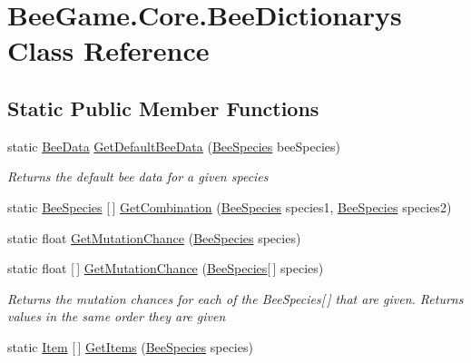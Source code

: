 \hypertarget{class_bee_game_1_1_core_1_1_bee_dictionarys}{}\section{Bee\+Game.\+Core.\+Bee\+Dictionarys Class Reference}
\label{class_bee_game_1_1_core_1_1_bee_dictionarys}


 


\subsection*{Static Public Member Functions}
\begin{DoxyCompactItemize}
\item 
static \hyperlink{struct_bee_game_1_1_bee_1_1_bee_data}{Bee\+Data} \hyperlink{class_bee_game_1_1_core_1_1_bee_dictionarys_acc616a791a2b14382dbff21433551596}{Get\+Default\+Bee\+Data} (\hyperlink{namespace_bee_game_1_1_enums_aa2ead984825678d83c42d48f6382619c}{Bee\+Species} bee\+Species)
\begin{DoxyCompactList}\small\item\em Returns the default bee data for a given species \end{DoxyCompactList}\item 
static \hyperlink{namespace_bee_game_1_1_enums_aa2ead984825678d83c42d48f6382619c}{Bee\+Species} \mbox{[}$\,$\mbox{]} \hyperlink{class_bee_game_1_1_core_1_1_bee_dictionarys_ac2d555d589392daf8d2919b6bf1fbad1}{Get\+Combination} (\hyperlink{namespace_bee_game_1_1_enums_aa2ead984825678d83c42d48f6382619c}{Bee\+Species} species1, \hyperlink{namespace_bee_game_1_1_enums_aa2ead984825678d83c42d48f6382619c}{Bee\+Species} species2)
\item 
static float \hyperlink{class_bee_game_1_1_core_1_1_bee_dictionarys_adb5fe5760a94dbff606bc1d20ee67aaa}{Get\+Mutation\+Chance} (\hyperlink{namespace_bee_game_1_1_enums_aa2ead984825678d83c42d48f6382619c}{Bee\+Species} species)
\item 
static float \mbox{[}$\,$\mbox{]} \hyperlink{class_bee_game_1_1_core_1_1_bee_dictionarys_ae563db005a03a49d25cb6cdbd4d3a82e}{Get\+Mutation\+Chance} (\hyperlink{namespace_bee_game_1_1_enums_aa2ead984825678d83c42d48f6382619c}{Bee\+Species}\mbox{[}$\,$\mbox{]} species)
\begin{DoxyCompactList}\small\item\em Returns the mutation chances for each of the Bee\+Species\mbox{[}$\,$\mbox{]} that are given. Returns values in the same order they are given \end{DoxyCompactList}\item 
static \hyperlink{struct_bee_game_1_1_items_1_1_item}{Item} \mbox{[}$\,$\mbox{]} \hyperlink{class_bee_game_1_1_core_1_1_bee_dictionarys_a2cd137701cfdcfeb25d5e7a73397e1b4}{Get\+Items} (\hyperlink{namespace_bee_game_1_1_enums_aa2ead984825678d83c42d48f6382619c}{Bee\+Species} species)
\end{DoxyCompactItemize}
